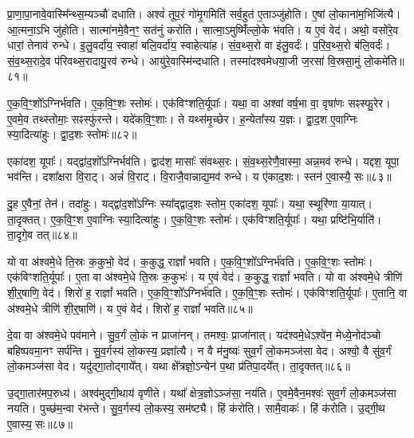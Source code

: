 प्रा॒णा॒पा॒नावे॒वास्मि᳚न्थ्स॒म्यञ्चौ॑ दधाति।
अश्वं॑ तूप॒रं गो॑मृ॒गमिति॑ सर्व॒हुत॑ ए॒ताञ्जु॑होति।
ए॒षां लो॒काना॑म॒भिजि॑त्यै।
आ॒त्मना॒ऽभि जु॑होति।
सात्मा॑नमे॒वैन॒ꣳ॒ सत॑नुं करोति।
सात्मा॒\-ऽमुष्मिँ॑ल्लो॒के भ॑वति।
य ए॒वं वेद॑।
अथो॒ वसो॑रे॒व धारां॒ तेनाव॑ रुन्धे।
इ॒लु॒वर्दा॑य॒ स्वाहा॑ बलि॒वर्दा॑य॒ स्वाहेत्या॑ह।
सं॒व॒थ्स॒रो वा इ॑लु॒वर्दः॑।
प॒रि॒व॒थ्स॒रो ब॑लि॒वर्दः॑।
सं॒व॒थ्स॒रादे॒व प॑रिवथ्स॒रादायु॒रव॑ रुन्धे।
आयु॑रे॒वास्मि॑न्दधाति।
तस्मा॑दश्वमेधया॒जी ज॒रसा॑ वि॒स्रसा॒मुं लो॒कमे॑ति॥८१॥\anuvakamend[तेज॒सो\-ऽव॑रुद्ध्यै भव॒न्त्यश्वो॑ गोमृ॒गमि॑लु॒वर्द॑श्च॒त्वारि॑ च]

ए॒क॒वि॒ꣳ॒शो᳚\-ऽग्निर्भ॑वति।
ए॒क॒वि॒ꣳ॒शः स्तोमः॑।
एक॑\-विꣳशति॒र्यूपाः᳚।
यथा॒ वा अश्वा॑ वर्\mbox{}ष॒भा वा॒ वृषा॑णः सꣴस्फु॒रेर\sn{}।
ए॒वमे॒व तथ्स्तोमाः॒ सꣴस्फु॑रन्ते।
यदे॑कवि॒ꣳ॒शाः।
ते यथ्स॑मृ॒च्छेर\sn{}।
ह॒न्येता᳚स्य य॒ज्ञः।
द्वा॒द॒श ए॒वाग्निः स्या॒दित्या॑हुः।
द्वा॒द॒शः स्तोमः॑॥८२॥

एका॑दश॒ यूपाः᳚।
यद्द्वा॑द॒शो᳚\-ऽग्निर्भव॑ति।
द्वाद॑श॒ मासाः᳚ संवथ्स॒रः।
सं॒व॒थ्स॒रेणै॒वास्मा॒ अन्न॒मव॑ रुन्धे।
यद्दश॒ यूपा॒ भव॑न्ति।
दशा᳚क्षरा वि॒राट्।
अन्नं॑ वि॒राट्।
वि॒राजै॒वान्नाद्य॒मव॑ रुन्धे।
य ए॑काद॒शः।
स्तन॑ ए॒वास्यै॒ सः॥८३॥

दु॒ह ए॒वैनां॒ तेन॑।
तदा॑हुः।
यद्द्वा॑द॒शो᳚\-ऽग्निः स्या᳚द्द्वाद॒शः स्तोम॒ एका॑दश॒ यूपाः᳚।
यथा॒ स्थूरि॑णा या॒यात्।
ता॒दृक्तत्।
ए॒क॒वि॒ꣳ॒श ए॒वाग्निः स्या॒दित्या॑हुः।
ए॒क॒वि॒ꣳ॒शः स्तोमः॑।
एक॑विꣳशति॒र्यूपाः᳚।
यथा॒ प्रष्टि॑भि॒र्याति॑।
ता॒दृगे॒व तत्॥८४॥

यो वा अ॑श्वमे॒धे ति॒स्रः क॒कुभो॒ वेद॑।
क॒कुद्ध॒ राज्ञां᳚ भवति।
ए॒क॒वि॒ꣳ॒शो᳚\-ऽग्निर्भ॑वति।
ए॒क॒वि॒ꣳ॒शः स्तोमः॑।
एक॑विꣳशति॒र्यूपाः᳚।
ए॒ता वा अ॑श्वमे॒धे ति॒स्रः क॒कुभः॑।
य ए॒वं वेद॑।
क॒कुद्ध॒ राज्ञां᳚ भवति।
यो वा अ॑श्वमे॒धे त्रीणि॑ शी॒र्॒षाणि॒ वेद॑।
शिरो॑ ह॒ राज्ञां᳚ भवति।
ए॒क॒वि॒ꣳ॒शो᳚\-ऽग्निर्भ॑वति।
ए॒क॒वि॒ꣳ॒शः स्तोमः॑।
एक॑विꣳशति॒र्यूपाः᳚।
ए॒तानि॒ वा अ॑श्वमे॒धे त्रीणि॑ शी॒र्॒षाणि॑।
य ए॒वं वेद॑।
शिरो॑ ह॒ राज्ञां᳚ भवति॥८५॥\anuvakamend[द्वा॒द॒शः स्तोमः॒ स ए॒व तच्छिरो॑ ह॒ राज्ञां᳚ भवति॒ षट् च॑]

दे॒वा वा अ॑श्वमे॒धे पव॑माने।
सु॒व॒र्गं लो॒कं न प्राजा॑नन्।
तमश्वः॒ प्राजा॑नात्।
यद॑श्वमे॒धे\-ऽश्वे॑न॒ मेध्ये॒नोद॑ञ्चो बहिष्पवमा॒नꣳ सर्प॑न्ति।
सु॒व॒र्गस्य॑ लो॒कस्य॒ प्रज्ञा᳚त्यै।
न वै म॑नु॒ष्यः॑ सुव॒र्गं लो॒कमञ्ज॑सा वेद।
अश्वो॒ वै सु॑व॒र्गं लो॒कमञ्ज॑सा वेद।
यदु॑द्गा॒तोद्गाये᳚त्।
यथा क्षे᳚त्रज्ञो॒\-ऽन्येन॑ प॒था प्र॑तिपा॒दये᳚त्।
ता॒दृक्तत्॥८६॥

उ॒द्गा॒तार॑मप॒रुध्य॑।
अश्व॑मुद्गी॒थाय॑ वृणीते।
यथा᳚ क्षेत्र॒ज्ञो\-ऽञ्ज॑सा॒ नय॑ति।
ए॒वमे॒वैन॒मश्वः॑ सुव॒र्गं लो॒कमञ्ज॑सा नयति।
पुच्छ॑म॒न्वा र॑भन्ते।
सु॒व॒र्गस्य॑ लो॒कस्य॒ सम॑ष्ट्यै।
हिं क॑रोति।
सामै॒वाकः॑।
हिं क॑रोति।
उ॒द्गी॒थ ए॒वास्य॒ सः॥८७॥

